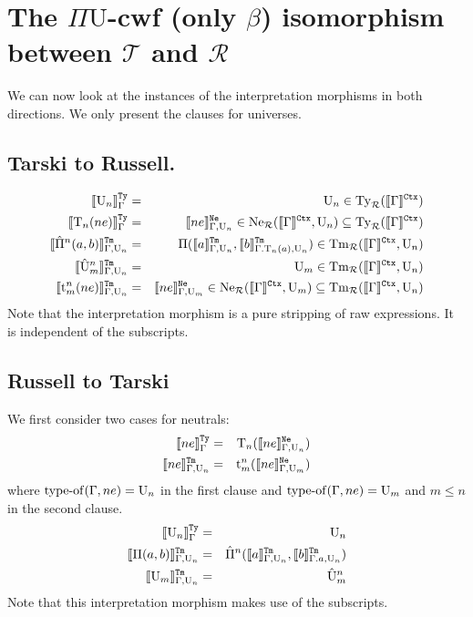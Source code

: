 \documentclass{lmcs}
\def\UU{\mathrm{U}}
\def\Ta{\mathrm{T}}
\def\Pihat{\hat{\Pi}}
\def\UUhat{\hat{\UU}}
\def\t{\mathrm{t}}
\def\RawNe{\texttt{Ne}}
\def\Ty{\mathrm{Ty}}
\def\Tm{\mathrm{Tm}}
\def\Ne{\mathrm{Ne}}
\def\T{\mathcal{T}}
\def\R{\mathcal{R}}
\newcommand{\intCtxU}[1]{\llbracket #1 \rrbracket^\RawCtx}
\newcommand{\intTyU}[1]{\llbracket #1 \rrbracket^\RawTy}
\newcommand{\intTmU}[1]{\llbracket #1 \rrbracket^\RawTm}
\newcommand{\intNeU}[1]{\llbracket #1 \rrbracket^\RawNe}
\begin{document}
\section{The $\Pi\UU$-cwf (only $\beta$) isomorphism between $\T$ and $\R$}

We can now look at the instances of the interpretation morphisms in both directions.
We only present the clauses for universes.

\subsection{Tarski to Russell.} 
\begin{eqnarray*}
\intTyU{\UU_n}_\Gamma &=& \UU_n \in \Ty_\R(\intCtxU{\Gamma})\\
\intTyU{\Ta_n(ne)}_\Gamma &=& \intNeU{ne}_{\Gamma,\UU_n}\in 
\Ne_\R(\intCtxU{\Gamma},\UU_n) \subseteq \Ty_\R(\intCtxU{\Gamma})\\
\intTmU{\Pihat^n(a,b)}_{\Gamma,\UU_n}
&=& \Pi(\intTmU{a}_{\Gamma,\UU_n},\intTmU{b}_{\Gamma.\Ta_n(a),\UU_n})
\in \Tm_\R(\intCtxU{\Gamma},\UU_n)\\
\intTmU{\UUhat^n_m}_{\Gamma,\UU_n} &=& \UU_m \in \Tm_\R(\intCtxU{\Gamma},\UU_n)\\
\intTmU{\t^n_m(ne)}_{\Gamma,\UU_n} &=& 
\intNeU{ne}_{\Gamma,\UU_{m}} \in \Ne_\R(\intCtxU{\Gamma},\UU_{m}) \subseteq \Tm_\R(\intCtxU{\Gamma},\UU_n)
\end{eqnarray*}
Note that the interpretation morphism is a pure stripping of raw expressions. It is independent of the subscripts.

\subsection{Russell to Tarski} 

We first consider two cases for neutrals:
\begin{eqnarray*}
\intTyU{ne}_\Gamma &=& \Ta_n(\intNeU{ne}_{\Gamma,\UU_n})\\
\intTmU{ne}_{\Gamma,\UU_{n}} &=& 
\t_m^n(\intNeU{ne}_{\Gamma,\UU_m})
\end{eqnarray*}
where $\typeof(\Gamma,ne) = \UU_n$ in the first clause and $\typeof(\Gamma,ne) = \UU_m$ and $m \leq n$ in the second clause. 
\begin{eqnarray*}
\intTyU{\UU_n}_\Gamma &=& \UU_n\\ 
\intTmU{\Pi(a,b)}_{\Gamma,\UU_n}&=& \Pihat^n(\intTmU{a}_{\Gamma,\UU_n},\intTmU{b}_{\Gamma.a,\UU_n})\\
\intTmU{\UU_m}_{\Gamma,\UU_{n}} &=& \UUhat_m^n
\end{eqnarray*}
Note that this interpretation morphism makes use of the subscripts.
\end{document}
